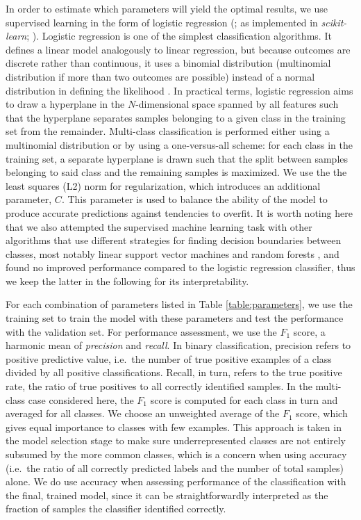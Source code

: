 \documentclass[12pt]{emulateapj}
\begin{document}
In order to estimate which parameters will yield the optimal results, we use supervised learning in the form of logistic regression (\citealt{cox1958}; as implemented in \textit{scikit-learn}; \citealt{scikit-learn}). Logistic regression is one of the simplest classification algorithms. It defines a linear model analogously to linear regression, but because outcomes are discrete rather than continuous, it uses a binomial distribution (multinomial distribution if more than two outcomes are possible) instead of a normal distribution in defining the likelihood \citep{cox1958}. In practical terms, logistic regression aims to draw a hyperplane in the $N$-dimensional space spanned by all features such that the hyperplane separates samples belonging to a given class in the training set from the remainder. Multi-class classification is performed either using a multinomial distribution or by using a one-versus-all scheme: for each class in the training set, a separate hyperplane is drawn such that the split between samples belonging to said class and the remaining samples is maximized. We use the the least squares (L2) norm for regularization, which introduces an additional parameter, $C$. This parameter is used to balance the ability of the model to produce accurate predictions against tendencies to overfit. It is worth noting here that we also attempted the supervised machine learning task with other algorithms that use different strategies for finding decision boundaries between classes, most notably linear support vector machines \citep{guyon1993,cortes1995} and random forests \citep{breiman2001}, and found no improved performance compared to the logistic regression classifier, thus we keep the latter in the following for its interpretability.

For each combination of parameters listed in Table \ref{table:parameters}, we use the training set to train the model with these parameters and test the performance with the validation set. For performance assessment, we use the $F_1$ score, a harmonic mean of \textit{precision} and \textit{recall}. In binary classification, precision refers to positive predictive value, i.e.\ the number of true positive examples of a class divided by all positive classifications. Recall, in turn, refers to the true positive rate, the ratio of true positives to all correctly identified samples. In the multi-class case considered here, the $F_1$ score is computed for each class in turn and averaged for all classes. We choose an unweighted average of the $F_1$ score, which gives equal importance to classes with few examples. This approach is taken in the model selection stage to make sure underrepresented classes are not entirely subsumed by the more common classes, which is a concern when using accuracy (i.e.\ the ratio of all correctly predicted labels and the number of total samples) alone. We do use accuracy when assessing performance of the classification with the final, trained model, since it can be straightforwardly interpreted as the fraction of samples the classifier identified correctly.
\end{document}
